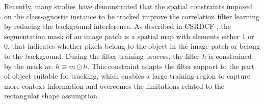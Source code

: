 \documentclass[review]{elsarticle}
\begin{document}
\begin{CJK*}{UTF8}{gbsn}
Recently, many studies \cite{Danelljan2015LearningSR, Lukezic2017DiscriminativeCF, Galoogahi2017LearningBC, Xu2018LearningAD, Feng2018LearningSR} have demonstrated that the spatial constraints imposed on the class-agnostic instance to be tracked improve the correlation filter learning by reducing the background interference. As described in CSRDCF \cite{Lukezic2017DiscriminativeCF}, the segmentation mask of an image patch is a spatial map with elements either 1 or 0, that indicates whether pixels belong to the object in the image patch or belong to the background. During the filter training process, the filter $h$ is constrained by the mask $m$: $h \equiv m \odot h$. This constraint adapts the filter support to the part of object suitable for tracking, which enables a large training region to capture more context information and overcomes the limitations related to the rectangular shape assumption.


\end{CJK*}
\end{document}
